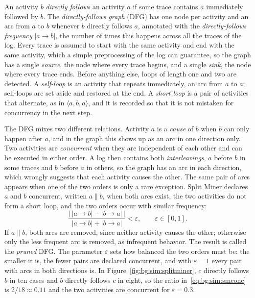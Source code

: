     An activity $b$ \emph{directly follows} an activity $a$ if some trace
    contains $a$ immediately followed by $b$. The \emph{directly-follows graph}
    (DFG) has one node per activity and an arc from $a$ to $b$ whenever $b$
    directly follows $a$, annotated with the \emph{directly-follows frequency}
    $|a \to b|$, the number of times this happens across all the traces of the
    log. Every trace is assumed to start with the same activity and end with the
    same activity, which a simple preprocessing of the log can guarantee, so the
    graph has a single \emph{source}, the node where every trace begins, and a
    single \emph{sink}, the node where every trace
    ends. Before anything else, loops of length one
    and two are detected. A \emph{self-loop} is an activity that repeats
    immediately, an arc from $a$ to $a$; self-loops are set aside and restored at
    the end. A \emph{short loop} is a pair of activities that alternate, as in
    $\langle a, b, a \rangle$, and it is recorded so that it is not mistaken for
    concurrency in the next step.
    
    The DFG mixes two different relations. Activity $a$ is a \emph{cause} of $b$
    when $b$ can only happen after $a$, and in the graph this shows up as an arc
    in one direction only. Two activities are \emph{concurrent} when they are
    independent of each other and can be executed in either order. A log then
    contains both \emph{interleavings}, $a$ before $b$ in some traces and $b$
    before $a$ in others, so the graph has an arc in each direction, which wrongly
    suggests that each activity causes the other. The same pair of arcs appears
    when one of the two orders is only a rare exception. Split Miner declares $a$
    and $b$ concurrent, written $a \parallel b$, when both arcs exist, the two
    activities do not form a short loop, and the two orders occur with similar
    frequency:
    \begin{equation}
    \frac{\bigl|\, |a \to b| - |b \to a| \,\bigr|}{|a \to b| + |b \to a|}
    < \varepsilon, \qquad \varepsilon \in [0, 1].
    \label{eq:bg:sim:smconc}
    \end{equation}
    If $a \parallel b$, both arcs are removed, since neither activity causes the
    other; otherwise only the less frequent arc is removed, as infrequent
    behavior. The result is called the \emph{pruned} DFG. The parameter
    $\varepsilon$ sets how balanced the two orders must be: the smaller it is,
    the fewer pairs are declared concurrent, and with $\varepsilon = 1$ every pair
    with arcs in both directions is. In
    Figure~\ref{fig:bg:sim:splitminer}, $c$ directly follows $b$ in ten cases and
    $b$ directly follows $c$ in eight, so the ratio
    in~\eqref{eq:bg:sim:smconc} is $2/18 \approx 0.11$ and the two activities are
    concurrent for $\varepsilon = 0.3$.
    
